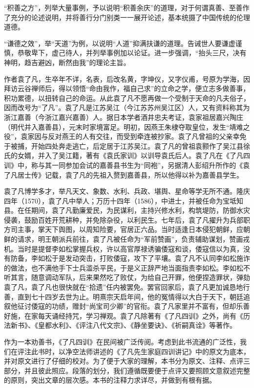 \documentclass[12pt,UTF8]{ctexbook}
\begin{document}
“积善之方”，列举大量事例，予以说明“积善余庆”的道理，对于何谓真善、至善作了充分的论述说明，并将善行分门别类一一展开论述，基本统摄了中国传统的伦理道德。

“谦德之效”，举“天道”为例，以说明“人道”抑满扶谦的道理。告诫世人要谦虚谨慎，恭敬卑下，虚己待人，并列举事例加以论证。进一步强调，“抬头三尺，决有神明，趋吉避凶，断然由我”的理论主旨。

作者袁了凡，生卒年不详，名表，后改名黄，字坤仪，又字仪甫，号原为学海，因拜访云谷禅师后，得以领悟“命由我作，福自己求”的立命之学，便立志多做善事，积功累德，以扭转自己的命运。从此袁了凡不愿再做一个受制于天命的凡夫俗子，因而改号为“了凡”。袁了凡是江苏吴江（今江苏苏州吴江区）人，又有资料称其为浙江嘉善（今浙江嘉兴嘉善）人。据日本学者酒井忠夫考证，袁家祖居嘉兴陶庄（明代并入嘉善县），元末时家境富足。明初，因燕王朱棣夺取皇位，发生“靖难之役”，袁家因与反对燕王的人有交往，而受到牵连被抄家。袁了凡曾祖的父亲幸免于被捕，开始四处奔走逃亡，后定居于江苏吴江。袁了凡的曾祖袁颢作了吴江县徐氏的女婿，并入了吴江籍，著有《袁氏家训》以训导袁氏后人。袁了凡在《了凡四训》中，称与其一同参加会试的嘉善县书生为“同袍”，另据清人彭绍升所作的《袁了凡居士传》记载，袁了凡的先祖入赘到嘉善县，所以他得以补为嘉善县学生。

袁了凡博学多才，举凡天文、象数、水利、兵政、堪舆、星命等学无所不通。隆庆四年（1570），袁了凡中举人；万历十四年（1586），中进士，并被任命为宝坻知县。在任期间，袁了凡勤廉爱民，为民谋利，主持兴修水利，构筑堤防，防御水灾侵袭，鼓励百姓开荒耕种，并免除杂役，以利民生。七年后，袁了凡擢升为兵部职方司主事，掌天下舆图，以周知险要，官居正六品。当时适逢日本侵犯朝鲜，应朝鲜的请求，明王朝派兵前往，袁了凡被任命为“军前赞画”，负责辅助谋划，赞画戎机。当时是提督李如松掌握兵权，许以高官厚禄诱骗倭寇和谈，倭寇信以为真，没有防备，李如松于是发动突击，打败倭寇，攻下了平壤。袁了凡不认同李如松施诈的做法，也不满他手下士兵滥杀平民，于是义正辞严地当面指责李如松。李如松不听其言，随意调动军队，后来果然吃了败仗，为给自己开罪，他便捏造罪状，弹劾袁了凡，袁了凡也很快就在“拾遗”任内被罢免。罢官回家后，袁了凡更加诚恳地行善，直到七十四岁去世为止。明熹宗天启年间，他的冤情得以大白于天下，朝廷追叙他征讨倭寇的功绩，赠封“尚宝司少卿”的官衔。袁了凡家里并不富有，但却乐善好施，在家每天诵经持咒，学习禅观。袁了凡除著有《了凡四训》之外，尚有《历法新书》、《皇都水利》、《评注八代文宗》、《静坐要诀》、《祈嗣真诠》等著作。

作为一本劝善书，《了凡四训》在民间被广泛传阅。考虑到此书流通的广泛性，我们在评注此书时，以净空法师讲述的《了凡先生家庭四训讲记》中的原文为底本，并对原文进行了仔细的校对。为了便于大家的理解，本书分为原文、注释、点评三部分，并且彼此照应。段落的划分，我们遵循既要便于点评又要照顾文意叙述完整的原则，突出文章的层次感。本书的注释力求详尽，并做到有根有据。
\end{document}
